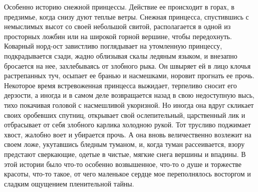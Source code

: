 Особенно историю  снежной принцессы.  Действие ее происходит  в горах,
в  предзимье,  когда  снизу  дуют  теплые  ветры.  Снежная  принцесса,
спустившись   с   немыслимых   высот  со   своей   небольшой   свитой,
располагается  в одной  из  просторных ложбин  или  на широкой  горной
вершине, чтобы  передохнуть. Коварный норд-ост  завистливо поглядывает
на утомленную  принцессу, подкрадывается сзади, жадно  облизывая скалы
ледяным языком, и внезапно бросается  на нее, захлебываясь от злобного
рыка. Он швыряет ей в лицо  клочья растрепанных туч, осыпает ее бранью
и насмешками, норовит прогнать ее прочь. Некоторое время встревоженная
принцесса выжидает, терпеливо сносит его  дерзости, а иногда и в самом
деле  возвращается  назад  в  свою недоступную  высь,  тихо  покачивая
головой с  насмешливой укоризной. Но  иногда она вдруг  скликает своих
оробевших  спутниц, открывает  свой ослепительный,  царственный лик  и
отбрасывает  от себя  злобного  карлика холодною  рукой. Тот  трусливо
поджимает  хвост,  жалобно  воет  и   убирается  прочь.  А  она  вновь
величественно возлежит  на своем ложе, укутавшись  бледным туманом, и,
когда туман рассеивается, взору предстают сверкающие, одетые в чистые,
мягкие снега  вершины и впадины.  В этой истории было  что-то особенно
возвышенное, что-то о душе и  торжестве красоты, что-то такое, от чего
маленькое  сердце  мое  переполнялось восторгом  и  сладким  ощущением
пленительной тайны.

